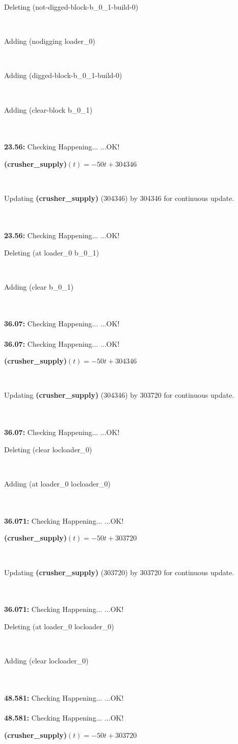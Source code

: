\documentclass[a4paper,12pt]{article}
\newcommand{\atime}[1]{{\bf #1:}}
\newcommand{\exprn}[1]{{\sf #1}}
\newcommand{\fexprn}[1]{{\small {\bf #1}}}
\newcommand{\checkhappening}{Checking Happening... }
\newcommand{\listrow}[1]{\begin{minipage}[t]{11.5cm} #1 \end{minipage}}
\newcommand{\happeningOK}{...OK!}
\newcommand{\assignmentcts}[3]{\listrow{Updating \fexprn{#1} (#2) by #3 for continuous update.}}
\newcommand{\function}[2]{\listrow{\fexprn{#1}$(t) = #2$}}
\newcommand{\adding}[1]{\listrow{Adding \exprn{#1} }}
\newcommand{\deleting}[1]{\listrow{Deleting \exprn{#1} }}
\begin{document}
\begin{tabbing}
 \> \deleting{(not-digged-block-b\_0\_1-build-0)}\\
 \> \adding{(nodigging loader\_0)}\\
 \> \adding{(digged-block-b\_0\_1-build-0)}\\
 \> \adding{(clear-block b\_0\_1)}\\
\\
\atime{23.56} \> \checkhappening\happeningOK\\
 \> \function{(crusher\_supply)}{ - 50t + 304346}\\
 \> \assignmentcts{(crusher\_supply)}{304346}{304346}\\
\\
\atime{23.56} \> \checkhappening\happeningOK\\
 \> \deleting{(at loader\_0 b\_0\_1)}\\
 \> \adding{(clear b\_0\_1)}\\
\\
\atime{36.07} \> \checkhappening\happeningOK\\
\\
\atime{36.07} \> \checkhappening\happeningOK\\
 \> \function{(crusher\_supply)}{ - 50t + 304346}\\
 \> \assignmentcts{(crusher\_supply)}{304346}{303720}\\
\\
\atime{36.07} \> \checkhappening\happeningOK\\
 \> \deleting{(clear locloader\_0)}\\
 \> \adding{(at loader\_0 locloader\_0)}\\
\\
\atime{36.071} \> \checkhappening\happeningOK\\
 \> \function{(crusher\_supply)}{ - 50t + 303720}\\
 \> \assignmentcts{(crusher\_supply)}{303720}{303720}\\
\\
\atime{36.071} \> \checkhappening\happeningOK\\
 \> \deleting{(at loader\_0 locloader\_0)}\\
 \> \adding{(clear locloader\_0)}\\
\\
\atime{48.581} \> \checkhappening\happeningOK\\
\\
\atime{48.581} \> \checkhappening\happeningOK\\
 \> \function{(crusher\_supply)}{ - 50t + 303720}\\

\end{tabbing}
\end{document}
